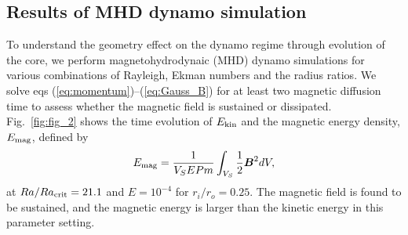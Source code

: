 \subsection{Results of MHD dynamo simulation}

To understand the geometry effect on the dynamo regime through evolution of the core, we perform magnetohydrodynaic (MHD) dynamo simulations for various combinations of Rayleigh, Ekman numbers and the radius ratios.
We solve eqs (\ref{eq:momentum})--(\ref{eq:Gauss_B}) for at least two magnetic diffusion time to assess whether the magnetic field is sustained or dissipated.
Fig.~\ref{fig:fig_2} shows the time evolution of $E_{\rm kin}$ and the magnetic energy density, $E_{\rm mag}$, defined by
%
\begin{equation}
E_{\rm mag} = \frac{1}{V_{S}E Pm} \int_{V_{S}} \frac{1}{2} \mbox{\boldmath$B$}^{2} dV,
\label{eq:magnetic_energy}
\end{equation}
%
at $Ra/Ra_{\rm crit} = 21.1$ and $E = 10^{-4}$ for $r_i/r_o = 0.25$.
The magnetic field is found to be sustained, and the magnetic energy is larger than the kinetic energy in this parameter setting.









